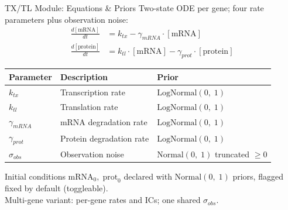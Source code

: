 \documentclass[aspectratio=169]{beamer}
\begin{document}

\begin{frame}[noframenumbering]{TX/TL Module: Equations \& Priors}
	\small
	Two-state ODE per gene; four rate parameters plus observation noise:
	\begin{align*}
		\frac{d[\text{mRNA}]}{dt} &= k_{tx} - \gamma_{mRNA} \cdot [\text{mRNA}] \\[6pt]
		\frac{d[\text{protein}]}{dt} &= k_{tl} \cdot [\text{mRNA}] - \gamma_{prot} \cdot [\text{protein}]
	\end{align*}

	\medskip
	\begin{tabular}{lll}
		\toprule
		\textbf{Parameter} & \textbf{Description} & \textbf{Prior} \\
		\midrule
		$k_{tx}$ & Transcription rate & $\text{LogNormal}(0,\;1)$ \\
		$k_{tl}$ & Translation rate & $\text{LogNormal}(0,\;1)$ \\
		$\gamma_{mRNA}$ & mRNA degradation rate & $\text{LogNormal}(0,\;1)$ \\
		$\gamma_{prot}$ & Protein degradation rate & $\text{LogNormal}(0,\;1)$ \\
		$\sigma_{obs}$ & Observation noise & $\text{Normal}(0,\;1)$ truncated $\geq 0$ \\
		\bottomrule
	\end{tabular}

	\medskip
	{\scriptsize Initial conditions $\text{mRNA}_0,\;\text{prot}_0$ declared with $\text{Normal}(0,\;1)$ priors, flagged fixed by default (toggleable).\\Multi-gene variant: per-gene rates and ICs; one shared $\sigma_{obs}$.}
\end{frame}
\end{document}
